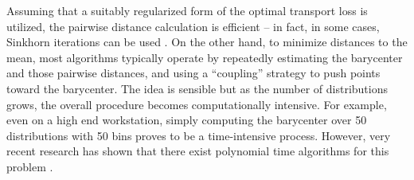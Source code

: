 Assuming that a suitably regularized form of the optimal transport loss is utilized, the pairwise distance 
calculation is efficient -- in fact, 
in some cases, Sinkhorn iterations can be used \cite{cuturi2013sinkhorn}. 
On the other hand, to minimize distances to the mean, 
most algorithms typically operate 
by repeatedly estimating the barycenter and those pairwise distances, and using a ``coupling'' strategy 
to push points toward the barycenter. 
The idea is sensible but as the number of distributions 
grows, the overall procedure becomes 
computationally intensive.
For example, even on a high end workstation, 
simply computing the barycenter over
50 distributions with 50 bins
proves to be a time-intensive process.
However, very recent research has shown that there exist polynomial time algorithms for this problem 
\cite{altschuler2021wasserstein}. 


